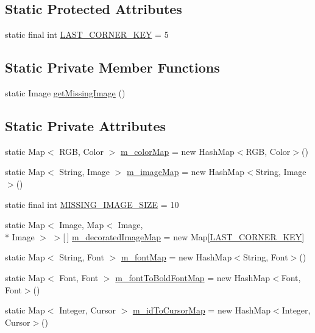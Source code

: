 \subsection*{Static Protected Attributes}
\begin{DoxyCompactItemize}
\item 
static final int \hyperlink{classorg_1_1eclipse_1_1wb_1_1swt_1_1_s_w_t_resource_manager_a891f728f55d1d9a7bb4247674e0092d0}{L\-A\-S\-T\-\_\-\-C\-O\-R\-N\-E\-R\-\_\-\-K\-E\-Y} = 5
\end{DoxyCompactItemize}
\subsection*{Static Private Member Functions}
\begin{DoxyCompactItemize}
\item 
static Image \hyperlink{classorg_1_1eclipse_1_1wb_1_1swt_1_1_s_w_t_resource_manager_a1ff45fd318d3ffda2bb99acbcf2153bc}{get\-Missing\-Image} ()
\end{DoxyCompactItemize}
\subsection*{Static Private Attributes}
\begin{DoxyCompactItemize}
\item 
static Map$<$ R\-G\-B, Color $>$ \hyperlink{classorg_1_1eclipse_1_1wb_1_1swt_1_1_s_w_t_resource_manager_afd71c42d6ae14521ce81ab8bb81042ff}{m\-\_\-color\-Map} = new Hash\-Map$<$R\-G\-B, Color$>$()
\item 
static Map$<$ String, Image $>$ \hyperlink{classorg_1_1eclipse_1_1wb_1_1swt_1_1_s_w_t_resource_manager_a1361269fb729876f24691c88f023b292}{m\-\_\-image\-Map} = new Hash\-Map$<$String, Image$>$()
\item 
static final int \hyperlink{classorg_1_1eclipse_1_1wb_1_1swt_1_1_s_w_t_resource_manager_af1e192f035fe5d70232cd33ca3810a4f}{M\-I\-S\-S\-I\-N\-G\-\_\-\-I\-M\-A\-G\-E\-\_\-\-S\-I\-Z\-E} = 10
\item 
static Map$<$ Image, Map$<$ Image, \\*
Image $>$ $>$\mbox{[}$\,$\mbox{]} \hyperlink{classorg_1_1eclipse_1_1wb_1_1swt_1_1_s_w_t_resource_manager_a4afc391e22118550ae0a76f7fa168d18}{m\-\_\-decorated\-Image\-Map} = new Map\mbox{[}\hyperlink{classorg_1_1eclipse_1_1wb_1_1swt_1_1_s_w_t_resource_manager_a891f728f55d1d9a7bb4247674e0092d0}{L\-A\-S\-T\-\_\-\-C\-O\-R\-N\-E\-R\-\_\-\-K\-E\-Y}\mbox{]}
\item 
static Map$<$ String, Font $>$ \hyperlink{classorg_1_1eclipse_1_1wb_1_1swt_1_1_s_w_t_resource_manager_ab59ada91478162a9affc7bd230005487}{m\-\_\-font\-Map} = new Hash\-Map$<$String, Font$>$()
\item 
static Map$<$ Font, Font $>$ \hyperlink{classorg_1_1eclipse_1_1wb_1_1swt_1_1_s_w_t_resource_manager_a8a49d99fd17a7c4fce84fe5beb13b01b}{m\-\_\-font\-To\-Bold\-Font\-Map} = new Hash\-Map$<$Font, Font$>$()
\item 
static Map$<$ Integer, Cursor $>$ \hyperlink{classorg_1_1eclipse_1_1wb_1_1swt_1_1_s_w_t_resource_manager_af23f14e130154fba7d494c9276f7f4b1}{m\-\_\-id\-To\-Cursor\-Map} = new Hash\-Map$<$Integer, Cursor$>$()
\end{DoxyCompactItemize}


